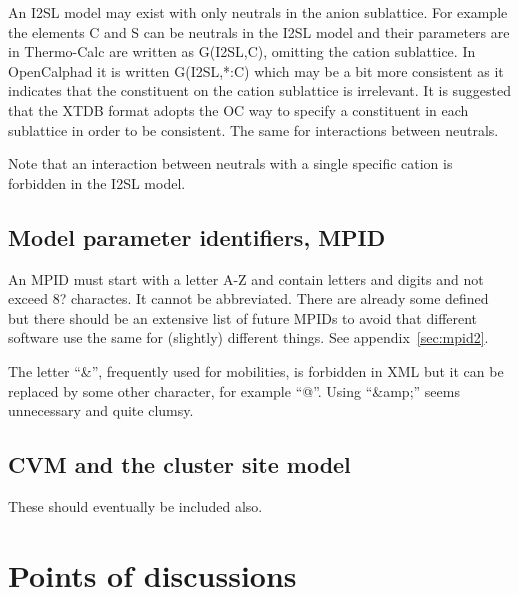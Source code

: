 \documentclass{article}
\begin{document}
An I2SL model may exist with only neutrals in the anion sublattice.
For example the elements C and S can be neutrals in the I2SL model and
their parameters are in Thermo-Calc are written as G(I2SL,C), omitting
the cation sublattice.  In OpenCalphad it is written G(I2SL,*:C) which
may be a bit more consistent as it indicates that the constituent on
the cation sublattice is irrelevant.  It is suggested that the XTDB
format adopts the OC way to specify a constituent in each sublattice
in order to be consistent.  The same for interactions between
neutrals.

Note that an interaction between neutrals with a single specific
cation is forbidden in the I2SL model.

\subsection{Model parameter identifiers, MPID}\label{sec:mpid}

An MPID must start with a letter A-Z and contain letters and digits
and not exceed 8? charactes.  It cannot be abbreviated.  There are
already some defined but there should be an extensive list of future
MPIDs to avoid that different software use the same for (slightly)
different things.  See appendix~\ref{sec:mpid2}.
  
The letter ``\&'', frequently used for mobilities, is forbidden in XML
but it can be replaced by some other character, for example ``@''.
Using ``\&amp;'' seems unnecessary and quite clumsy.

\subsection{CVM and the cluster site model}

These should eventually be included also.


\section{Points of discussions}
\end{document}
